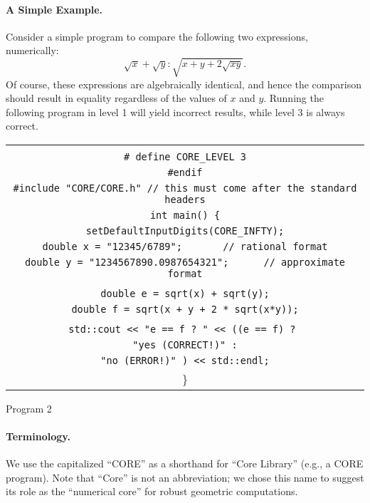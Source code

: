 \documentclass[12pt]{article}
\begin{document}
\paragraph{A Simple Example.}
\label{sec-example-sqrt}
Consider a simple program to compare the following
two expressions, numerically:
	$$\sqrt{x}+\sqrt{y} : \sqrt{x+y+2\sqrt{xy}}.$$
Of course, these expressions are algebraically identical, and
hence the comparison should result in equality regardless
of the values of $x$ and $y$.  Running the following program
in level 1 will yield incorrect results, while level 3 is always correct.

\begin{center}
\begin{tabular}{c}
\begin{progb}{
\> \tt \#ifndef CORE\_LEVEL\\
\> \tt \#   define CORE\_LEVEL 3\\
\> \tt \#endif\\

\> \tt \#include "CORE/CORE.h"  // this must come after the standard headers\\

\> \tt int main() \{\\
\>\>  \tt setDefaultInputDigits(CORE\_INFTY);\\
\>\>  \tt double x = "12345/6789"; \ \ \ \ \  \  // rational format\\
\>\>  \tt double y = "1234567890.0987654321"; \ \ \ \ \ //  approximate format\\
\\
\>\>  \tt double e = sqrt(x) + sqrt(y);\\
\>\>  \tt double f = sqrt(x + y + 2 * sqrt(x*y));\\
\\
\>\>  \tt std::cout << "e == f ? " << ((e == f) ? \\
\>\>\>\tt 	  "yes (CORRECT!)" :\\
\>\>\>\tt 	  "no (ERROR!)"  ) << std::endl;\\
\> \}
}\end{progb}
\end{tabular}
Program 2
\end{center}


\paragraph{Terminology.}
We use the capitalized ``CORE''
as a shorthand for ``Core Library'' (e.g., a CORE program).
Note that ``Core'' is not an abbreviation; we chose this name 
to suggest its role as the ``numerical core''
for robust geometric computations.
\end{document}
